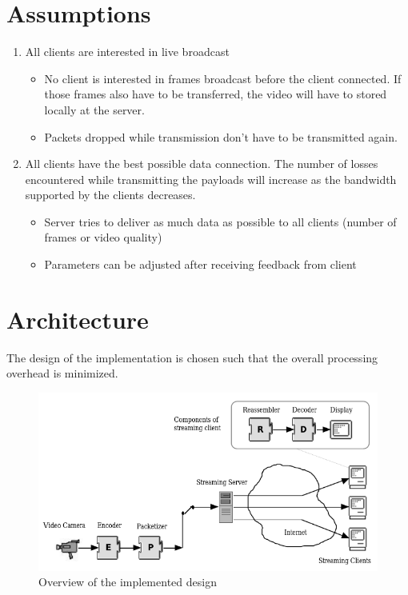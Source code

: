 \documentclass[a4paper]{article}
\begin{document}
\pagebreak

  \section{Assumptions}
    \begin{enumerate}
      \item All clients are interested in live broadcast
      \begin{itemize}
    	\item No client is interested in frames broadcast before the client connected. If those frames also have to be transferred, the video will have to stored locally at the server.
        \item Packets dropped while transmission don't have to be transmitted again.
      \end{itemize}
      \item All clients have the best possible data connection. The number of losses encountered while transmitting the payloads will increase as the bandwidth supported by the clients decreases.
      \begin{itemize}
        \item Server tries to deliver as much data as possible to all clients (number of frames or video quality)
        \item Parameters can be adjusted after receiving feedback from client
      \end{itemize}
    \end{enumerate}

  \section{Architecture}
  The design of the implementation is chosen such that the overall processing overhead is minimized.
  \begin{figure}[h]
    \centering
    \includegraphics[scale=0.5]{design.png}
    \caption{Overview of the implemented design}
  \end{figure}
\end{document}
